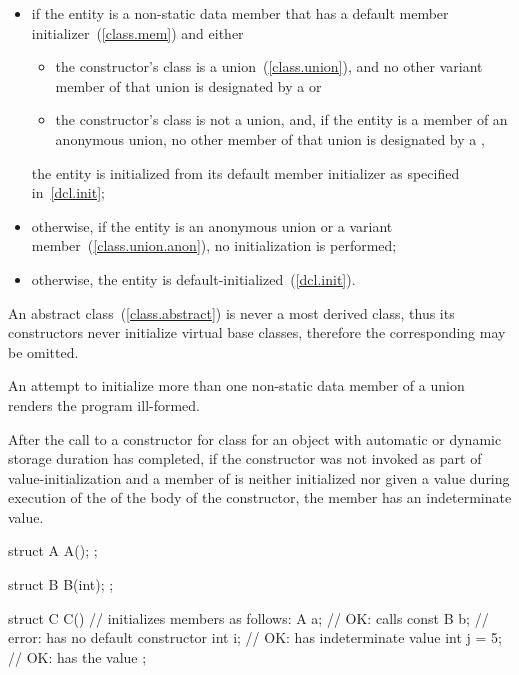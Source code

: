 \begin{itemize}
\item if the entity is a non-static data member that has
a default member initializer~(\ref{class.mem}) and either

\begin{itemize}
\item the constructor's class is a union~(\ref{class.union}), and no other variant
member of that union is designated by a  or

\item the constructor's class is not a union, and, if the entity is a member of an
anonymous union, no other member of that union is designated by a
,
\end{itemize}

the entity is initialized from its default member initializer
as specified in~\ref{dcl.init};

\item otherwise, if the entity is an anonymous union or a variant member~(\ref{class.union.anon}), no initialization is performed;

\item otherwise, the entity is default-initialized~(\ref{dcl.init}).
\end{itemize}

\begin{note} An abstract class~(\ref{class.abstract}) is never a most derived
class, thus its constructors never initialize virtual base classes, therefore the
corresponding  may be omitted. \end{note}
An attempt to initialize more than one non-static data member of a union renders the
program ill-formed.
%
%
\begin{note}
After the call to a constructor for class
for an object with automatic or dynamic storage duration
has completed, if
the constructor was not invoked as part of value-initialization and
a member of
is neither initialized nor
given a value
during execution of the  of the body of the constructor,
the member has an indeterminate value.
\end{note}
\begin{example}
\begin{codeblock}
struct A {
  A();
};

struct B {
  B(int);
};

struct C {
  C() { }               // initializes members as follows:
  A a;                  // OK: calls 
  const B b;            // error:  has no default constructor
  int i;                // OK:  has indeterminate value
  int j = 5;            // OK:  has the value 
};
\end{codeblock}
\end{example}

